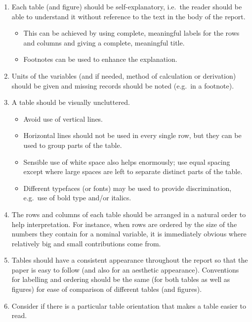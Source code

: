 \documentclass[
  a4paper,
]{memoir}
\providecommand{\tightlist}{%
  \setlength{\itemsep}{0pt}\setlength{\parskip}{0pt}}\usepackage{longtable,booktabs,array}
\begin{document}
\begin{enumerate}
\def\labelenumi{\arabic{enumi}.}
\tightlist
\item
  Each table (and figure) should be self-explanatory, i.e.~the reader
  should be able to understand it without reference to the text in the
  body of the report.

  \begin{itemize}
  \tightlist
  \item
    This can be achieved by using complete, meaningful labels for the
    rows and columns and giving a complete, meaningful title.
  \item
    Footnotes can be used to enhance the explanation.
  \end{itemize}
\item
  Units of the variables (and if needed, method of calculation or
  derivation) should be given and missing records should be noted
  (e.g.~in a footnote).
\item
  A table should be visually uncluttered.

  \begin{itemize}
  \tightlist
  \item
    Avoid use of vertical lines.
  \item
    Horizontal lines should not be used in every single row, but they
    can be used to group parts of the table.
  \item
    Sensible use of white space also helps enormously; use equal spacing
    except where large spaces are left to separate distinct parts of the
    table.
  \item
    Different typefaces (or fonts) may be used to provide
    discrimination, e.g.~use of bold type and/or italics.
  \end{itemize}
\item
  The rows and columns of each table should be arranged in a natural
  order to help interpretation. For instance, when rows are ordered by
  the size of the numbers they contain for a nominal variable, it is
  immediately obvious where relatively big and small contributions come
  from.
\item
  Tables should have a consistent appearance throughout the report so
  that the paper is easy to follow (and also for an aesthetic
  appearance). Conventions for labelling and ordering should be the same
  (for both tables as well as figures) for ease of comparison of
  different tables (and figures).
\item
  Consider if there is a particular table orientation that makes a table
  easier to read.
\end{enumerate}
\end{document}
